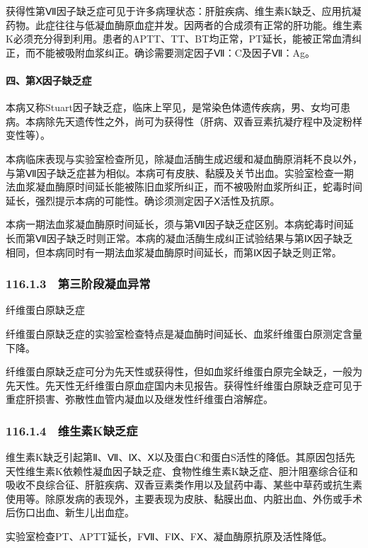 获得性第Ⅶ因子缺乏症可见于许多病理状态：肝脏疾病、维生素K缺乏、应用抗凝药物。此症往往与低凝血酶原血症并发。因两者的合成须有正常的肝功能。维生素K必须充分得到利用。患者的APTT、TT、BT均正常，PT延长，能被正常血清纠正，而不能被吸附血浆纠正。确诊需要测定因子Ⅶ：C及因子Ⅶ：Ag。

\paragraph{四、第Ⅹ因子缺乏症}

本病又称Stuart因子缺乏症，临床上罕见，是常染色体遗传疾病，男、女均可患病。本病除先天遗传性之外，尚可为获得性（肝病、双香豆素抗凝疗程中及淀粉样变性等）。

本病临床表现与实验室检查所见，除凝血活酶生成迟缓和凝血酶原消耗不良以外，与第Ⅶ因子缺乏症甚为相似。本病可有皮肤、黏膜及关节出血。实验室检查一期法血浆凝血酶原时间延长能被陈旧血浆所纠正，而不被吸附血浆所纠正，蛇毒时间延长，强烈提示本病的可能性。确诊须测定因子Ⅹ活性及抗原。

本病一期法血浆凝血酶原时间延长，须与第Ⅶ因子缺乏症区别。本病蛇毒时间延长而第Ⅶ因子缺乏时则正常。本病的凝血活酶生成纠正试验结果与第Ⅸ因子缺乏相同，但本病同时有一期法血浆凝血酶原时间延长，而第Ⅸ因子缺乏则正常。

\subsubsection{116.1.3　第三阶段凝血异常}

纤维蛋白原缺乏症

纤维蛋白原缺乏症的实验室检查特点是凝血酶时间延长、血浆纤维蛋白原测定含量下降。

纤维蛋白原缺乏症可分为先天性或获得性，但如血浆纤维蛋白原完全缺乏，一般为先天性。先天性无纤维蛋白原血症国内未见报告。获得性纤维蛋白原缺乏症可见于重症肝损害、弥散性血管内凝血以及继发性纤维蛋白溶解症。

\subsubsection{116.1.4　维生素K缺乏症}

维生素K缺乏引起第Ⅱ、Ⅶ、Ⅸ、Ⅹ以及蛋白C和蛋白S活性的降低。其原因包括先天性维生素K依赖性凝血因子缺乏症、食物性维生素K缺乏症、胆汁阻塞综合征和吸收不良综合征、肝脏疾病、双香豆素类作用以及鼠药中毒、某些中草药或抗生素使用等。除原发病的表现外，主要表现为皮肤、黏膜出血、内脏出血、外伤或手术后伤口出血、新生儿出血症。

实验室检查PT、APTT延长，FⅦ、FⅨ、FⅩ、凝血酶原抗原及活性降低。

